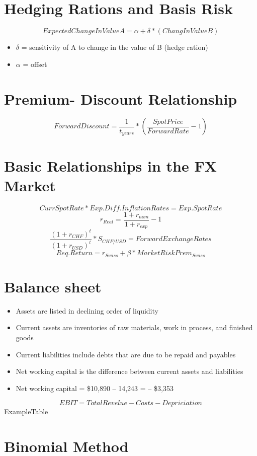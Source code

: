 \documentclass{cheatsheet}
\begin{document}
\section*{Hedging Rations and Basis Risk}
\[ExpectedChangeInValueA = \alpha + \delta * (ChangInValueB)\]
\begin{itemize}
  \item $\delta$ = sensitivity of A to change in the value of B (hedge ration)
  \item $\alpha$ = offset
\end{itemize}
\section*{Premium- Discount Relationship}
\[ForwardDiscount = \frac{1}{t_{years}} * (\frac{SpotPrice}{ForwardRate} - 1)\]
\section*{Basic Relationships
in the FX Market}
\vspace{30mm}
\[CurrSpotRate * Exp.Diff.InflationRates = Exp.SpotRate\]
\[r_{Real} = \frac{1+r_{nom}}{1+r_{exp}}-1\]
\[\frac{(1+r_{CHF})^t}{(1+r_{USD})^t}*S_{CHF/USD} = ForwardExchangeRates\]
\[Req.Return = r_{Swiss} + \beta * MarketRiskPrem_{Swiss}\]
\section*{Balance sheet}
\begin{itemize}
  \item Assets are listed in declining order of liquidity
  \item Current assets are inventories of raw materials, work in process, and finished goods
  \item Current liabilities include debts that are due to be repaid and payables
  \item Net working capital is the difference between current assets and liabilities
  \item Net working capital = \$10,890 -- 14,243 = -- \$3,353
\end{itemize}

\[EBIT = TotalRevelue - Costs - Depriciation\]
\vspace{30mm}
ExampleTable
\section*{Binomial Method}
\end{document}

